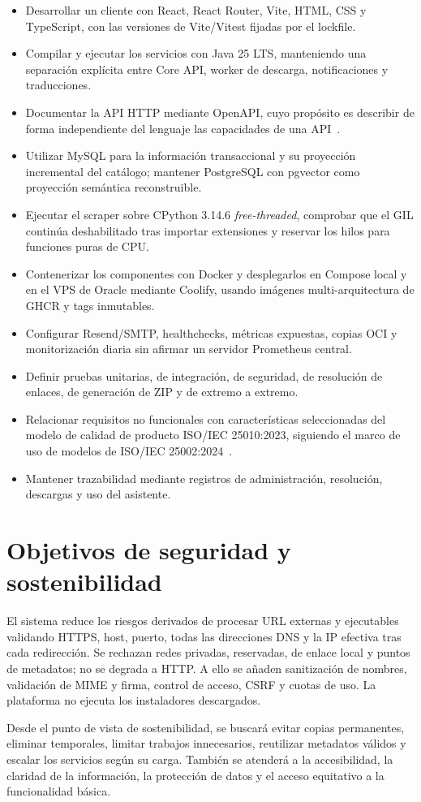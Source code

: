 \begin{itemize}
	\item Desarrollar un cliente con React, React Router, Vite, HTML, CSS y TypeScript, con las versiones de Vite/Vitest fijadas por el lockfile.
	\item Compilar y ejecutar los servicios con Java 25 LTS, manteniendo una separación explícita entre Core API, worker de descarga, notificaciones y traducciones.
	\item Documentar la API HTTP mediante OpenAPI, cuyo propósito es describir de forma independiente del lenguaje las capacidades de una API~\cite{openapi}.
	\item Utilizar MySQL para la información transaccional y su proyección incremental del catálogo; mantener PostgreSQL con pgvector como proyección semántica reconstruible.
	\item Ejecutar el scraper sobre CPython 3.14.6 \emph{free-threaded}, comprobar que el GIL continúa deshabilitado tras importar extensiones y reservar los hilos para funciones puras de CPU.
	\item Contenerizar los componentes con Docker y desplegarlos en Compose local y en el VPS de Oracle mediante Coolify, usando imágenes multi-arquitectura de GHCR y tags inmutables.
	\item Configurar Resend/SMTP, healthchecks, métricas expuestas, copias OCI y monitorización diaria sin afirmar un servidor Prometheus central.
	\item Definir pruebas unitarias, de integración, de seguridad, de resolución de enlaces, de generación de ZIP y de extremo a extremo.
	\item Relacionar requisitos no funcionales con características seleccionadas del modelo de calidad de producto ISO/IEC 25010:2023, siguiendo el marco de uso de modelos de ISO/IEC 25002:2024~\cite{iso25010,iso25002}.
	\item Mantener trazabilidad mediante registros de administración, resolución, descargas y uso del asistente.
\end{itemize}

\section{Objetivos de seguridad y sostenibilidad}

El sistema reduce los riesgos derivados de procesar URL externas y ejecutables validando HTTPS, host, puerto, todas las direcciones DNS y la IP efectiva tras cada redirección. Se rechazan redes privadas, reservadas, de enlace local y puntos de metadatos; no se degrada a HTTP. A ello se añaden sanitización de nombres, validación de MIME y firma, control de acceso, CSRF y cuotas de uso. La plataforma no ejecuta los instaladores descargados.

Desde el punto de vista de sostenibilidad, se buscará evitar copias permanentes, eliminar temporales, limitar trabajos innecesarios, reutilizar metadatos válidos y escalar los servicios según su carga. También se atenderá a la accesibilidad, la claridad de la información, la protección de datos y el acceso equitativo a la funcionalidad básica.
